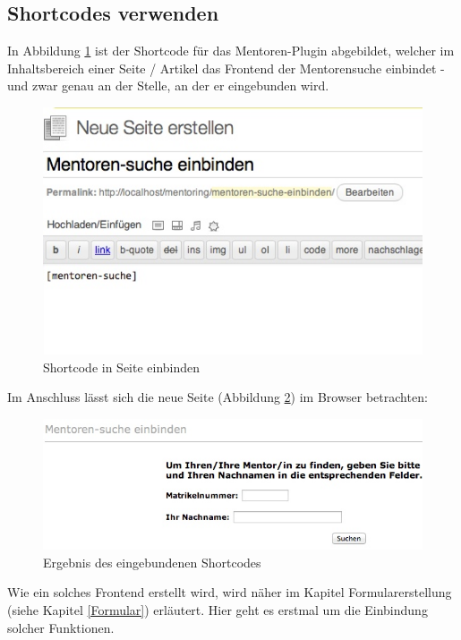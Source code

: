 \subsection{Shortcodes verwenden}
In Abbildung \ref{img:SHISEINB} ist der Shortcode für das Mentoren-Plugin abgebildet, welcher im Inhaltsbereich einer Seite / Artikel das Frontend der Mentorensuche einbindet - und zwar genau an der Stelle, an der er eingebunden wird.
   \begin{figure}[htbp]
	\begin{center}
	\includegraphics[angle={360}, scale=0.61]{pictures/shortcodeeinb.jpg}
	    \caption{Shortcode in Seite einbinden}
	    \label{img:SHISEINB}
	\end{center}
   \end{figure}\newline
Im Anschluss lässt sich die neue Seite (Abbildung \ref{img:shortcideeinber}) im Browser betrachten:
   \begin{figure}[htbp]
	\begin{center}
	\includegraphics[angle={360}, scale=0.61]{pictures/shortcideeinber.jpg}
	    \caption{Ergebnis des eingebundenen Shortcodes}
	    \label{img:shortcideeinber}
	\end{center}
   \end{figure}
   \newpage
Wie ein solches Frontend erstellt wird, wird näher im Kapitel Formularerstellung (siehe Kapitel \ref{Formular}) erläutert. Hier geht es erstmal um die Einbindung solcher Funktionen.\newline

